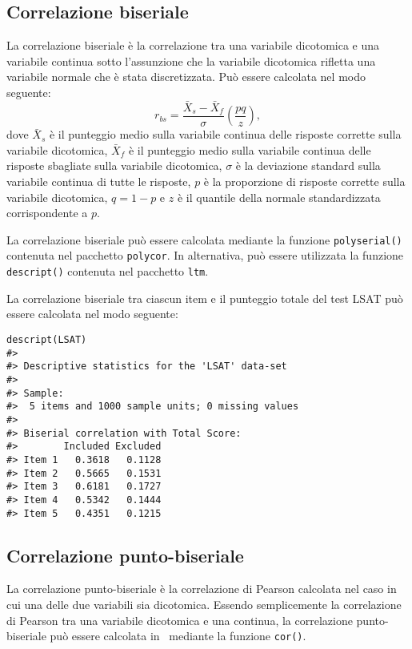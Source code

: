 \subsection{Correlazione biseriale}

La correlazione biseriale è la correlazione tra una variabile
    dicotomica e una variabile continua sotto l'assunzione che la
    variabile dicotomica rifletta una variabile normale che è stata
    discretizzata.  Può essere calcolata nel modo seguente: 
\begin{equation}
r_{bs}=\frac{\bar{X}_s - \bar{X}_f}{\sigma}\left( \frac{pq}{z} \right),
\end{equation}
dove $\bar{X}_s$ è il punteggio medio sulla variabile continua delle 
risposte corrette sulla variabile dicotomica, $\bar{X}_f$
è il punteggio medio sulla variabile continua delle risposte
sbagliate sulla variabile dicotomica, $\sigma$ è la deviazione
standard sulla variabile continua di tutte le risposte, $p$ è la
proporzione di risposte corrette sulla variabile dicotomica, $q=1-p$ e
$z$ è il quantile della normale standardizzata corrispondente a $p$. 

 La correlazione biseriale può essere calcolata mediante la
    funzione {\tt polyserial()} contenuta nel pacchetto {\tt polycor}.  
 In alternativa, può essere utilizzata la funzione {\tt
      descript()} contenuta nel  pacchetto {\tt ltm}.  



\begin{exmp}

La correlazione biseriale tra ciascun item e il punteggio
    totale del test LSAT può  essere calcolata nel modo
    seguente: 

\begin{lstlisting}
descript(LSAT)
#> 
#> Descriptive statistics for the 'LSAT' data-set
#> 
#> Sample:
#>  5 items and 1000 sample units; 0 missing values
#> 
#> Biserial correlation with Total Score:
#>        Included Excluded
#> Item 1   0.3618   0.1128
#> Item 2   0.5665   0.1531
#> Item 3   0.6181   0.1727
#> Item 4   0.5342   0.1444
#> Item 5   0.4351   0.1215
\end{lstlisting}

\end{exmp}

\subsection{Correlazione punto-biseriale}

La correlazione punto-biseriale è la correlazione di Pearson calcolata nel caso in cui  una delle due variabili sia dicotomica.  Essendo semplicemente la correlazione di Pearson tra una
    variabile dicotomica e una continua, la correlazione
    punto-biseriale può essere calcolata in \R\, mediante la funzione
    {\tt cor()}. 






